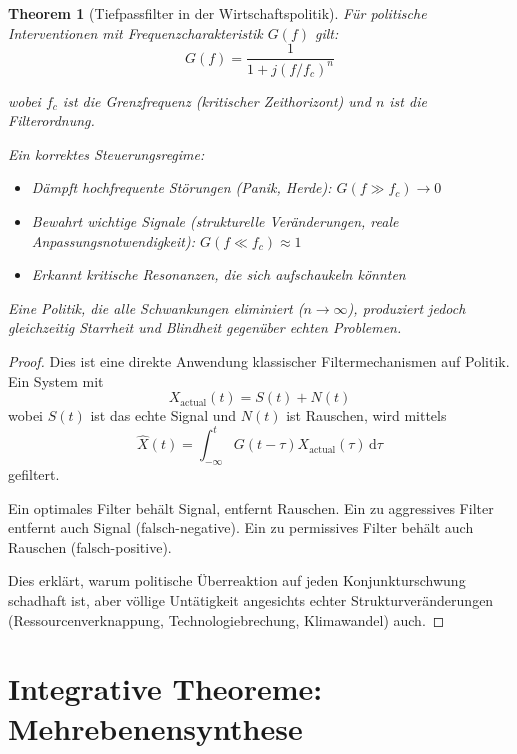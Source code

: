 \documentclass[a4paper, 12pt, twoside, openright]{report}
\newtheorem{theorem}{Theorem}[section]
\theoremstyle{definition}
\theoremstyle{definition}
\begin{document}
\begin{theorem}[Tiefpassfilter in der Wirtschaftspolitik]
\label{thm:filter-signal}
Für politische Interventionen mit Frequenzcharakteristik $G(f)$ gilt:
\begin{equation}
G(f) = \frac{1}{1 + j(f/f_c)^n}
\end{equation}

wobei $f_c$ ist die Grenzfrequenz (kritischer Zeithorizont) und $n$ ist die Filterordnung.

Ein korrektes Steuerungsregime:
\begin{itemize}
\item Dämpft hochfrequente Störungen (Panik, Herde): $G(f \gg f_c) \to 0$
\item Bewahrt wichtige Signale (strukturelle Veränderungen, reale Anpassungsnotwendigkeit): $G(f \ll f_c) \approx 1$
\item Erkannt kritische Resonanzen, die sich aufschaukeln könnten
\end{itemize}

Eine Politik, die \emph{alle} Schwankungen eliminiert ($n \to \infty$), produziert jedoch gleichzeitig Starrheit und Blindheit gegenüber echten Problemen.
\end{theorem}

\begin{proof}
Dies ist eine direkte Anwendung klassischer Filtermechanismen auf Politik. Ein System mit
\begin{equation}
X_{\text{actual}}(t) = S(t) + N(t)
\end{equation}
wobei $S(t)$ ist das echte Signal und $N(t)$ ist Rauschen, wird mittels
\begin{equation}
\hat{X}(t) = \int_{-\infty}^{t} G(t-\tau) X_{\text{actual}}(\tau) \, \mathrm{d}\tau
\end{equation}
gefiltert. 

Ein optimales Filter behält Signal, entfernt Rauschen. Ein zu aggressives Filter entfernt auch Signal (falsch-negative). Ein zu permissives Filter behält auch Rauschen (falsch-positive).

Dies erklärt, warum politische Überreaktion auf jeden Konjunkturschwung schadhaft ist, aber völlige Untätigkeit angesichts echter Strukturveränderungen (Ressourcenverknappung, Technologiebrechung, Klimawandel) auch.
\end{proof}

\section{Integrative Theoreme: Mehrebenensynthese}
\end{document}
